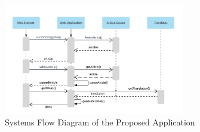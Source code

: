 \begin{figure}
	\caption{Systems Flow Diagram of the Proposed Application}
	\label{fig:sf}
	\begin{center}
	\includegraphics[width=0.7\textwidth]{Graphics/SystemsFlow}
\end{center}
\end{figure}